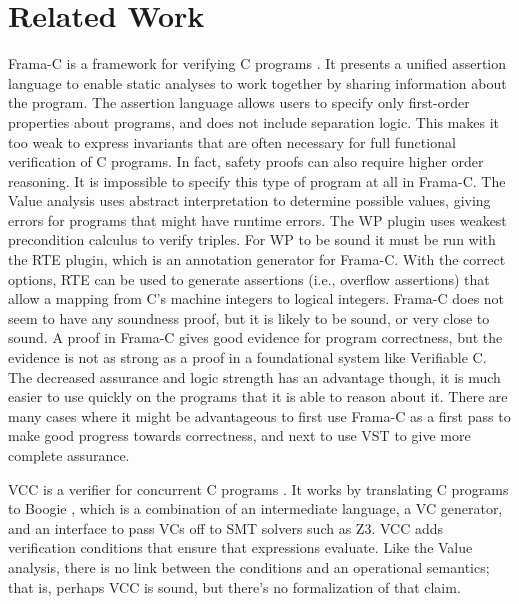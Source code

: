 \documentclass{puthesis}
\begin{document}
\section{Related Work}
Frama-C is a framework for verifying C programs
\cite{cuoq2012frama}. It presents a unified assertion language to
enable static analyses to work together by sharing information about
the program. The assertion language allows
users to specify only first-order properties about programs, and does
not include separation logic. This makes it too weak to express
invariants that are often necessary for full functional verification
of C programs. In fact, safety proofs can also require higher order
reasoning. It is impossible to specify this type of program at all in Frama-C.
The Value analysis \cite{canet2009value}
uses abstract interpretation to determine possible values, giving
errors for programs that might have runtime errors. The WP plugin uses
weakest precondition \cite{mull} calculus to verify triples.  For WP to be sound
it must be run with the RTE plugin\cite{RTEpluginmanual}, which is an annotation generator
for Frama-C. With the correct options, RTE can be used to generate
assertions (i.e., overflow assertions) that allow a mapping from C's
machine integers to logical integers. 
Frama-C does not seem to have any soundness proof, but it is likely to
be sound, or very close to sound. A proof in Frama-C gives good
evidence for program correctness, but the evidence is not as strong as
a proof in a foundational system like Verifiable C. The decreased
assurance and logic strength has an advantage though, it is much
easier to use quickly on the programs that it is able to reason about
it. There are many cases where it might be advantageous to first use
Frama-C as a first pass to make good progress towards correctness, and
next to use VST to give more complete assurance. 


VCC is a verifier for concurrent C programs \cite{VCCtphol}. It works
by translating C programs to Boogie \cite{Boogie}, which is a
combination of an intermediate language, a VC generator, and an
interface to pass VCs off to SMT solvers such as Z3\cite{z3:tacas}.
VCC adds verification conditions that ensure that expressions
evaluate. Like the Value analysis, there is no link between the
conditions and an operational semantics; that is, perhaps VCC is
sound, but there's no formalization of that claim. 
\end{document}
